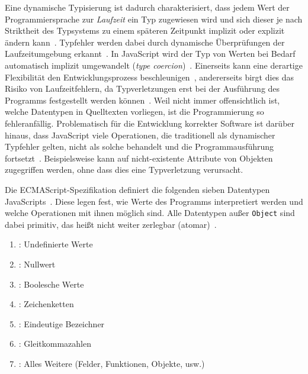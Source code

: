 Eine dynamische Typisierung ist dadurch charakterisiert, dass jedem Wert der Programmiersprache zur \emph{Laufzeit} ein Typ zugewiesen wird und sich dieser je nach Striktheit des Typsystems zu einem späteren Zeitpunkt implizit oder explizit ändern kann~\autocite[45]{WALDMANN:PPS}. Typfehler werden dabei durch dynamische Überprüfungen der Laufzeitumgebung erkannt~\autocite[37]{CARDELLI:TYPE_SYSTEMS}. In JavaScript wird der Typ von Werten bei Bedarf automatisch implizit umgewandelt (\emph{type coercion})~\autocite{RICHARDS:2010}. Einerseits kann eine derartige Flexibilität den Entwicklungsprozess beschleunigen~\autocite[1]{FLOW:PAPER}, andererseits birgt dies das Risiko von Laufzeitfehlern, da Typverletzungen erst bei der Ausführung des Programms festgestellt werden können~\autocite{ANDERSON:2005}. Weil nicht immer offensichtlich ist, welche Datentypen in Quelltexten vorliegen, ist die Programmierung so fehleranfällig. Problematisch für die Entwicklung korrekter Software ist darüber hinaus, dass JavaScript viele Operationen, die traditionell als dynamischer Typfehler gelten, nicht als solche behandelt und die Programmausführung fortsetzt~\autocite{NIKHIL:2014}. Beispielsweise kann auf nicht-existente Attribute von Objekten zugegriffen werden, ohne dass dies eine Typverletzung verursacht.

Die ECMAScript-Spezifikation definiert die folgenden sieben Datentypen JavaScripts~\autocite[25]{ECMASCRIPT:2019}. Diese legen fest, wie Werte des Programms interpretiert werden und welche Operationen mit ihnen möglich sind. Alle Datentypen außer \texttt{Object} sind dabei primitiv, das heißt nicht weiter zerlegbar (atomar)~\autocite[8]{ECMASCRIPT:2019}.

\pagebreak
\begin{enumerate}[midpenalty=1000]
  \item {}: Undefinierte Werte
  \item {}: Nullwert
  \item {}: Boolesche Werte
  \item {}: Zeichenketten
  \item {}: Eindeutige Bezeichner
  \item {}: Gleitkommazahlen
  \item {}: Alles Weitere (Felder, Funktionen, Objekte, usw.)
\end{enumerate}


